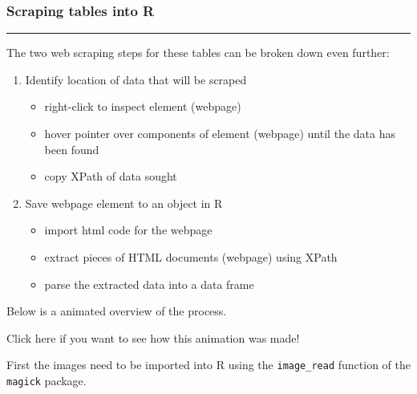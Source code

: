 \documentclass[
]{article}
\providecommand{\tightlist}{%
  \setlength{\itemsep}{0pt}\setlength{\parskip}{0pt}}
\begin{document}
\hypertarget{scraping-tables-into-r}{%
\subsubsection{\texorpdfstring{\textbf{Scraping tables into
R}}{Scraping tables into R}}\label{scraping-tables-into-r}}

\begin{center}\rule{0.5\linewidth}{0.5pt}\end{center}

The two web scraping steps for these tables can be broken down even
further:

\begin{enumerate}
\def\labelenumi{\arabic{enumi}.}
\item
  Identify location of data that will be scraped

  \begin{itemize}
  \tightlist
  \item
    right-click to inspect element (webpage)
  \item
    hover pointer over components of element (webpage) until the data
    has been found
  \item
    copy XPath of data sought
  \end{itemize}
\item
  Save webpage element to an object in R

  \begin{itemize}
  \tightlist
  \item
    import html code for the webpage
  \item
    extract pieces of HTML documents (webpage) using XPath
  \item
    parse the extracted data into a data frame
  \end{itemize}
\end{enumerate}

Below is a animated overview of the process.

Click here if you want to see how this animation was made!

First the images need to be imported into R using the
\texttt{image\_read} function of the \texttt{magick} package.
\end{document}
